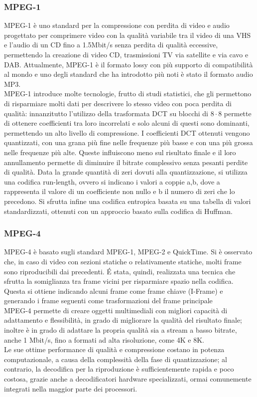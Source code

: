		\subsubsection{MPEG-1}
			MPEG-1 è uno standard per la compressione con perdita di video e audio progettato per comprimere video con la qualità variabile tra il video di una \gls{VHS} e l'audio di un CD fino a 1.5Mbit/s senza perdita di qualità eccessive, permettendo la creazione di video CD, trasmissioni TV via satellite e via cavo e \gls{DAB}. Attualmente, MPEG-1 è il formato lossy con più supporto di compatibilità al mondo e uno degli standard che ha introdotto più noti è stato il formato audio MP3.
			\\
			MPEG-1 introduce molte tecnologie, frutto di studi statistici, che gli permettono di risparmiare molti dati per descrivere lo stesso video con poca perdita di qualità: innanzitutto l'utilizzo della trasformata DCT su blocchi di \(8\cdot8\) permette di ottenere coefficienti tra loro incorrelati e solo alcuni di questi sono dominanti, permettendo un alto livello di compressione. I coefficienti DCT ottenuti vengono quantizzati, con una grana più fine nelle frequenze più basse e con una più grossa nelle frequenze più alte. Queste influiscono meno sul risultato finale e il loro annullamento permette di diminuire il bitrate complessivo senza pesanti perdite di qualità.
			Data la grande quantità di zeri dovuti alla quantizzazione, si utilizza una codifica run-length, ovvero si indicano i valori a coppie a,b, dove a rappresenta il valore di un coefficiente non nullo e b il numero di zeri che lo precedono. Si sfrutta infine una codifica entropica basata su una tabella di valori standardizzati, ottenuti con un approccio basato sulla codifica di Huffman.

		\subsubsection{MPEG-4}
			MPEG-4 è basato sugli standard MPEG-1, MPEG-2 e QuickTime. Si è osservato che, in caso di video con sezioni statiche o relativamente statiche, molti frame sono riproducibili dai precedenti. É stata, quindi, realizzata una tecnica che sfrutta la somiglianza tra frame vicini per risparmiare spazio nella codifica. Questa si ottiene indicando alcuni frame come frame chiave (I-Frame) e generando i frame seguenti come trasformazioni del frame principale
			\\
			MPEG-4 permette di creare oggetti multimediali con migliori capacità di adattamento e flessibilità, in grado di migliorare la qualità del risultato finale; inoltre è in grado di adattare la propria qualità sia a stream a basso bitrate, anche 1 Mbit/s, fino a formati ad alta risoluzione, come 4K e 8K.
			\\
			Le sue ottime performance di qualità e compressione costano in potenza computazionale, a causa della complessità della fase di quantizzazione; al contrario, la decodifica per la riproduzione è sufficientemente rapida e poco costosa, grazie anche a decodificatori hardware specializzati, ormai comunemente integrati nella maggior parte dei processori.

